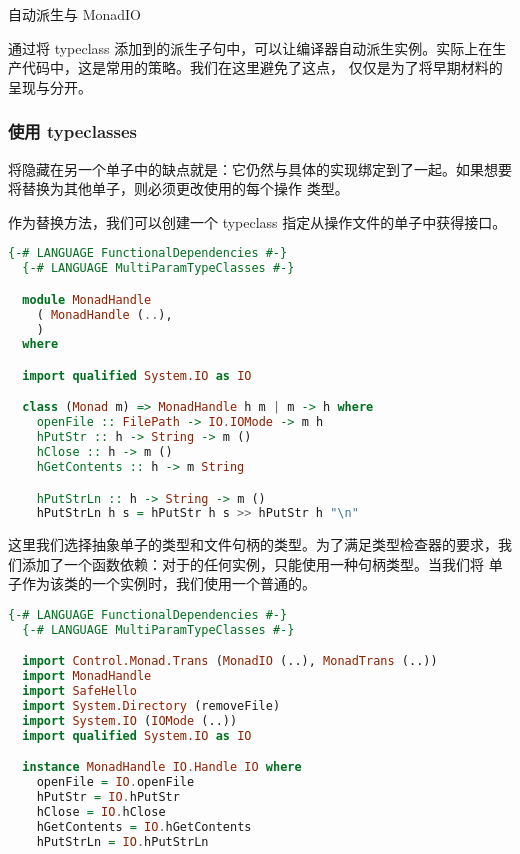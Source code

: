 \documentclass[./main.tex]{subfiles}
\begin{document}
\begin{anote}
  自动派生与 MonadIO

  通过将 typeclass 添加到的派生子句中，可以让编译器自动派生实例。实际上在生产代码中，这是常用的策略。我们在这里避免了这点，
  仅仅是为了将早期材料的呈现与分开。
\end{anote}

\subsubsection*{使用 typeclasses}

将隐藏在另一个单子中的缺点就是：它仍然与具体的实现绑定到了一起。如果想要将替换为其他单子，则必须更改使用的每个操作
类型。

作为替换方法，我们可以创建一个 typeclass 指定从操作文件的单子中获得接口。

\begin{lstlisting}[language=Haskell]
  {-# LANGUAGE FunctionalDependencies #-}
  {-# LANGUAGE MultiParamTypeClasses #-}

  module MonadHandle
    ( MonadHandle (..),
    )
  where

  import qualified System.IO as IO

  class (Monad m) => MonadHandle h m | m -> h where
    openFile :: FilePath -> IO.IOMode -> m h
    hPutStr :: h -> String -> m ()
    hClose :: h -> m ()
    hGetContents :: h -> m String

    hPutStrLn :: h -> String -> m ()
    hPutStrLn h s = hPutStr h s >> hPutStr h "\n"
\end{lstlisting}

这里我们选择抽象单子的类型和文件句柄的类型。为了满足类型检查器的要求，我们添加了一个函数依赖：对于的任何实例，只能使用一种句柄类型。当我们将
单子作为该类的一个实例时，我们使用一个普通的。

\begin{lstlisting}[language=Haskell]
  {-# LANGUAGE FunctionalDependencies #-}
  {-# LANGUAGE MultiParamTypeClasses #-}

  import Control.Monad.Trans (MonadIO (..), MonadTrans (..))
  import MonadHandle
  import SafeHello
  import System.Directory (removeFile)
  import System.IO (IOMode (..))
  import qualified System.IO as IO

  instance MonadHandle IO.Handle IO where
    openFile = IO.openFile
    hPutStr = IO.hPutStr
    hClose = IO.hClose
    hGetContents = IO.hGetContents
    hPutStrLn = IO.hPutStrLn
\end{lstlisting}
\end{document}
